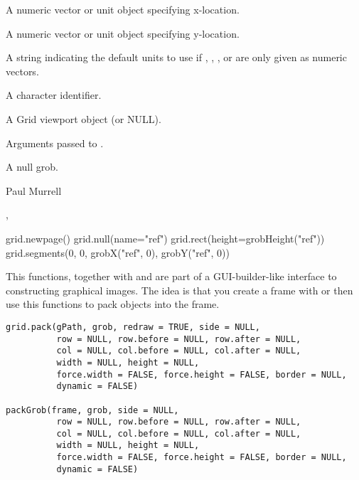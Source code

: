 %
\begin{Arguments}
\begin{ldescription}
\item[\code{x}] A numeric vector or unit object specifying x-location.
\item[\code{y}] A numeric vector or unit object specifying y-location.
\item[\code{default.units}] A string indicating the default units to use
if , , , or 
are only given as numeric vectors. 
\item[\code{name}]  A character identifier. 
\item[\code{vp}] A Grid viewport object (or NULL).
\item[\code{...}] Arguments passed to .
\end{ldescription}
\end{Arguments}
%
\begin{Value}
A null grob.  
\end{Value}
%
\begin{Author}\relax
Paul Murrell
\end{Author}
%
\begin{SeeAlso}\relax
{},
\end{SeeAlso}
%
\begin{Examples}
\begin{ExampleCode}
grid.newpage()
grid.null(name="ref")
grid.rect(height=grobHeight("ref"))
grid.segments(0, 0, grobX("ref", 0), grobY("ref", 0))
\end{ExampleCode}
\end{Examples}
%
\begin{Description}\relax
This functions, together with  and 
are part of a
GUI-builder-like interface to constructing graphical images.
The idea is that you create a frame with  or
 then
use this functions to pack objects into the frame.
\end{Description}
%
\begin{Usage}
\begin{verbatim}
grid.pack(gPath, grob, redraw = TRUE, side = NULL,
          row = NULL, row.before = NULL, row.after = NULL,
          col = NULL, col.before = NULL, col.after = NULL,
          width = NULL, height = NULL,
          force.width = FALSE, force.height = FALSE, border = NULL,
          dynamic = FALSE)

packGrob(frame, grob, side = NULL,
          row = NULL, row.before = NULL, row.after = NULL,
          col = NULL, col.before = NULL, col.after = NULL,
          width = NULL, height = NULL,
          force.width = FALSE, force.height = FALSE, border = NULL,
          dynamic = FALSE)
\end{verbatim}
\end{Usage}
